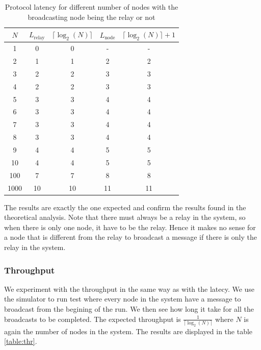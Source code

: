 \documentclass[a4paper]{article}
\begin{document}
\begin{table}[H]
\centering
\begin{tabular}{|c|c|c|c|c|}
    \hline
    $N$  & $L_{\text{relay}}$ & $\lceil\log_2(N)\rceil$ & $L_{\text{node}}$ & $\lceil\log_2(N)\rceil + 1$ \\
    \hline
    1     & 0    & 0    & -    & -    \\
    2     & 1    & 1    & 2    & 2    \\
    3     & 2    & 2    & 3    & 3    \\
    4     & 2    & 2    & 3    & 3    \\
    5     & 3    & 3    & 4    & 4    \\
    6     & 3    & 3    & 4    & 4    \\
    7     & 3    & 3    & 4    & 4    \\
    8     & 3    & 3    & 4    & 4    \\
    9     & 4    & 4    & 5    & 5    \\
    10    & 4    & 4    & 5    & 5    \\
    100   & 7    & 7    & 8    & 8    \\
    1000  & 10   & 10   & 11   & 11   \\
    \hline
\end{tabular}
\caption{Protocol latency for different number of nodes with the broadcasting node being the relay or not}
\label{table:la}
\end{table}

The results are exactly the one expected and confirm the results found in the
theoretical analysis. Note that there must always be a relay in the system, so
when there is only one node, it have to be the relay. Hence it makes no sense
for a node that is different from the relay to broadcast a message if there is
only the relay in the system.

\subsubsection*{Throughput}
We experiment with the throughput in the same way as with the latecy. We use
the simulator to run test where every node in the system have a message to
broadcast from the begining of the run. We then see how long it take for all
the broadcasts to be completed. The expected throughput is
$\frac{1}{\lceil\log_2(N)\rceil}$ where $N$ is again the number of nodes in
the system. The results are displayed in the table \ref{table:thr}.
\end{document}
